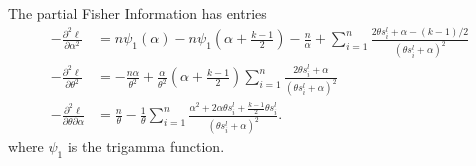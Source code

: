 \documentclass[
]{article}
\begin{document}
The partial Fisher Information has entries \begin{align*}
 -\frac{\partial^2 \ell}{\partial \alpha^2} &=
   n\psi_1\left(\alpha\right) - n\psi_1\left(\alpha+\frac{k-1}{2}\right)
  - \frac{n}{\alpha} +\sum_{i=1}^n \frac{2\theta s_i^l + \alpha-(k-1)/2}{(\theta s_i^l + \alpha)^2}\\
-\frac{\partial^2 \ell}{\partial \theta^2} &=
   -\frac{n \alpha}{\theta^2} +\frac{\alpha}{\theta^2}\left(\alpha+\frac{k-1}{2}\right)\sum_{i=1}^n \frac{2\theta s_i^l + \alpha}{(\theta s_i^l + \alpha)^2}\\
-\frac{\partial^2 \ell}{\partial \theta\partial\alpha} &= \frac{n}{\theta}-
   \frac1\theta \sum_{i=1}^n \frac{\alpha^2+2\alpha\theta s_i^l+\frac{k-1}{2}\theta s_i^l}{(\theta s_i^l + \alpha)^2}.
\end{align*} where \(\psi_1\) is the trigamma function.
\end{document}
